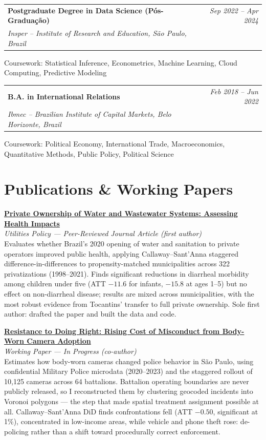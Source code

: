 \documentclass[10pt, letterpaper]{article}
\makeatletter
\newcommand{\cvedu}[4]{%
  \noindent
  \begin{tabularx}{\linewidth}{@{}X r@{}}
    \textbf{#1} & \textit{\small #4} \\[0pt]
    \textit{\small #2, #3} & \\
  \end{tabularx}%
  \vspace{0pt}%
}
\newcommand{\cvpub}[3]{%
  \noindent\textbf{#1}\\[0.5pt]
  {\small\textit{#2}}\\[0.5pt]
  {\small #3}%
  \par\vspace{7pt}%
}
\makeatother
\begin{document}
\vspace{3.5pt}

\cvedu{Postgraduate Degree in Data Science (Pós-Graduação)}{Insper – Institute of Research and Education}{São Paulo, Brazil}{Sep 2022 – Apr 2024}
{\small Coursework: Statistical Inference, Econometrics, Machine Learning, Cloud Computing, Predictive Modeling}

\vspace{3.5pt}

\cvedu{B.A. in International Relations}{Ibmec – Brazilian Institute of Capital Markets}{Belo Horizonte, Brazil}{Feb 2018 – Jun 2022}
{\small Coursework: Political Economy, International Trade, Macroeconomics, Quantitative Methods, Public Policy, Political Science}

\section{Publications \& Working Papers}

\cvpub{\href{https://www.sciencedirect.com/science/article/abs/pii/S0957178725000189}{Private Ownership of Water and Wastewater Systems: Assessing Health Impacts}}
      {Utilities Policy — Peer-Reviewed Journal Article \textnormal{(first author)}}
      {Evaluates whether Brazil's 2020 opening of water and sanitation to private operators improved public health, applying Callaway–Sant'Anna staggered difference-in-differences to propensity-matched municipalities across 322 privatizations (1998–2021). Finds significant reductions in diarrheal morbidity among children under five (ATT $-11.6$ for infants, $-15.8$ at ages 1–5) but no effect on non-diarrheal disease; results are mixed across municipalities, with the most robust evidence from Tocantins' transfer to full private ownership. Sole first author: drafted the paper and built the data and code.}

\cvpub{\href{https://papers.ssrn.com/sol3/papers.cfm?abstract_id=5441274}{Resistance to Doing Right: Rising Cost of Misconduct from Body-Worn Camera Adoption}}
      {Working Paper — In Progress \textnormal{(co-author)}}
      {Estimates how body-worn cameras changed police behavior in São Paulo, using confidential Military Police microdata (2020–2023) and the staggered rollout of 10,125 cameras across 64 battalions. Battalion operating boundaries are never publicly released, so I reconstructed them by clustering geocoded incidents into Voronoi polygons — the step that made spatial treatment assignment possible at all. Callaway–Sant'Anna DiD finds confrontations fell (ATT $-0.50$, significant at 1\%), concentrated in low-income areas, while vehicle and phone theft rose: de-policing rather than a shift toward procedurally correct enforcement.}
\end{document}
